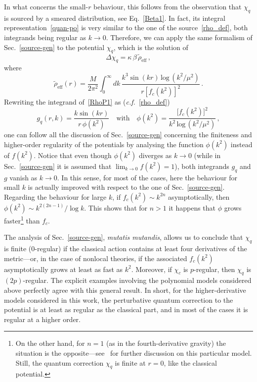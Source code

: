 \documentclass[aps,prd,a4paper,twocolumn,showpacs,showkeys,preprintnumbers,amsmath,amssymb,nofootinbib]{revtex4-2}
\numberwithin{equation}{section}
\def\ln{\,\mbox{log}\,}
\def\be{\beta}
\def\De{\Delta}
\def\ka{\kappa}
\begin{document}
In what concerns the small-$r$ behaviour, this follows from the observation that $\chi_q$ is sourced by a smeared distribution, see Eq.~\eqref{Beta1}. In fact, its integral representation~\eqref{quan-po} is very similar to the one of the source~\eqref{rho_def}, both integrands being regular as $k \to 0$.
Therefore, we can apply the same formalism of Sec.~\ref{source-gen} to the potential $\chi_q$, which is the solution of
%
\begin{equation} 
\De \chi_q = \ka \, \be \, \tilde{\rho}_{\text{eff}} \, ,
\end{equation}
where
\begin{equation} \label{RhoP1}
\tilde{\rho}_{\text{eff}}(r) = \frac{M}{2 \pi ^2} \int_0^\infty dk  \,\frac{k^3 \sin (kr) \ln (k^2/\mu^2) }{r \left[ f_c (k^2)\right]^2}  
\, .
\end{equation}
Rewriting the integrand of~\eqref{RhoP1}  as (\textit{c.f.}~\eqref{rho_def})
\begin{equation} \label{104}
 g_q(r,k) = \frac{k \sin(kr)}{r \, \phi(k^2)} \quad \text{with} \quad \phi(k^2) = \frac{\big[ f_c (k^2)\big]^2}{k^2 \ln \left(  k^2/ \mu^2\right)} \, ,
\end{equation}
one can follow all the discussion of Sec.~\ref{source-gen} concerning the finiteness and higher-order regularity of the potentials by analysing the function $\phi(k^2)$ instead of $f(k^2)$. Notice that even though $\phi(k^2)$ diverges as $k \to 0$ (while in Sec.~\ref{source-gen} it is assumed that $\lim_{k\to 0}f(k^2) = 1$), both integrands $g_q$ and $g$ vanish as $k \to 0$. In this sense, for most of the cases, here the behaviour for small $k$ is actually improved with respect to the one of Sec.~\ref{source-gen}. Regarding the behaviour for large $k$, if $f_c (k^2) \sim k^{2n}$ asymptotically, then $\phi(k^2) \sim k^{2(2n-1)}/\log k$. This shows that for $n>1$ it happens that $\phi$ grows faster\footnote{On the other hand, for $n=1$ (as in the fourth-derivative gravity) the situation is the opposite---see~\cite{Nos4der} for further discussion on this particular model. Still, the quantum correction $\chi_q$ is finite at $r=0$, like the classical potential.} than $f_c$. 


The analysis of Sec.~\ref{source-gen}, \textit{mutatis mutandis}, allows us to conclude that $\chi_q$ is finite (0-regular) if the classical action contains at least four derivatives of the metric---or, in the case of nonlocal theories, if the associated $f_c (k^2)$ asymptotically grows at least as fast as $k^2$. Moreover, if $\chi_c$ is $p$-regular, then $\chi_q$ is $(2p)$-regular. The explicit examples involving the polynomial models considered above perfectly agree with this general result. In short, for the higher-derivative models considered in this work, the perturbative quantum correction to the potential is at least as regular as the classical part, and in most of the cases it is regular at a higher order.
\end{document}
